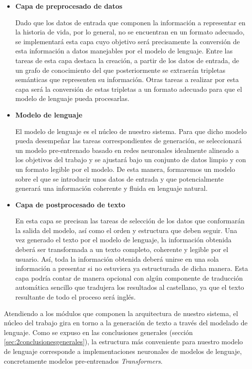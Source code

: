 \begin{itemize}
\item \textbf{Capa de preprocesado de datos} \hfill

Dado que los datos de entrada que componen la información a representar en la historia de vida, por lo general, no se encuentran en un formato adecuado, se implementará esta capa cuyo objetivo será precisamente la conversión de esta información a datos manejables por el modelo de lenguaje. Entre las tareas de esta capa destaca la creación, a partir de los datos de entrada, de un grafo de conocimiento del que posteriormente se extraerán tripletas semánticas que representen su información. Otras tareas a realizar por esta capa será la conversión de estas tripletas a un formato adecuado para que el modelo de lenguaje pueda procesarlas.


\item \textbf{Modelo de lenguaje} \hfill

El modelo de lenguaje es el núcleo de nuestro sistema. Para que dicho modelo pueda desempeñar las tareas correspondientes de generación, se seleccionará un modelo pre-entrenado basado en redes neuronales idealmente alineado a los objetivos del trabajo y se ajustará bajo un conjunto de datos limpio y con un formato legible por el modelo. De esta manera, formaremos un modelo sobre el que se introducir unos datos de entrada y que potencialmente generará una información coherente y fluida en lenguaje natural.


\item \textbf{Capa de postprocesado de texto}\hfill

En esta capa se precisan las tareas de selección de los datos que conformarán la salida del modelo, así como el orden y estructura que deben seguir. Una vez generado el texto por el modelo de lenguaje, la información obtenida deberá ser transformada a un texto completo, coherente y legible por el usuario. Así, toda la información obtenida deberá unirse en una sola información a presentar si no estuviera ya estructurada de dicha manera. Esta capa podría contar de manera opcional con algún componente de traducción automática sencillo que tradujera los resultados al castellano, ya que el texto resultante de todo el proceso será inglés.

\end{itemize}
Atendiendo a los módulos que componen la arquitectura de nuestro sistema, el núcleo del trabajo gira en torno a la generación de texto a través del modelado de lenguaje. Como se expuso en las conclusiones generales (sección \ref{sec:2conclusionesgenerales}), la estructura más conveniente para nuestro modelo de lenguaje corresponde a implementaciones neuronales de modelos de lenguaje, concretamente modelos pre-entrenados \textit{Transformers}.  

